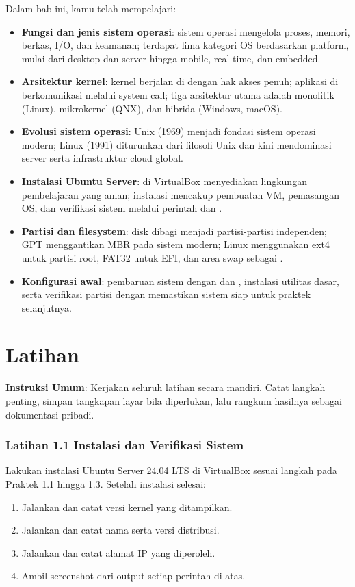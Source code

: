 Dalam bab ini, kamu telah mempelajari:

\begin{itemize}[noitemsep,topsep=2pt]
    \item \textbf{Fungsi dan jenis sistem operasi}: sistem operasi mengelola proses,
    memori, berkas, I/O, dan keamanan; terdapat lima kategori OS berdasarkan platform,
    mulai dari desktop dan server hingga mobile, real-time, dan embedded.
    \item \textbf{Arsitektur kernel}: kernel berjalan di  dengan hak akses
    penuh; aplikasi di  berkomunikasi melalui system call; tiga arsitektur
    utama adalah monolitik (Linux), mikrokernel (QNX), dan hibrida (Windows, macOS).
    \item \textbf{Evolusi sistem operasi}: Unix (1969) menjadi fondasi sistem operasi
    modern; Linux (1991) diturunkan dari filosofi Unix dan kini mendominasi server serta
    infrastruktur cloud global.
    \item \textbf{Instalasi Ubuntu Server}:  di VirtualBox menyediakan
    lingkungan pembelajaran yang aman; instalasi mencakup pembuatan VM, pemasangan OS,
    dan verifikasi sistem melalui perintah  dan .
    \item \textbf{Partisi dan filesystem}: disk dibagi menjadi partisi-partisi
    independen; GPT menggantikan MBR pada sistem modern; Linux menggunakan ext4 untuk
    partisi root, FAT32 untuk EFI, dan area swap sebagai .
    \item \textbf{Konfigurasi awal}: pembaruan sistem dengan  dan
    , instalasi utilitas dasar, serta verifikasi partisi dengan
     memastikan sistem siap untuk praktek selanjutnya.
\end{itemize}

\section{Latihan}
\label{sec:tugas}

\textbf{Instruksi Umum}: Kerjakan seluruh latihan secara mandiri. Catat langkah
penting, simpan tangkapan layar bila diperlukan, lalu rangkum hasilnya sebagai
dokumentasi pribadi.

\subsubsection*{Latihan 1.1 Instalasi dan Verifikasi Sistem}
Lakukan instalasi Ubuntu Server 24.04 LTS di VirtualBox sesuai langkah pada
Praktek 1.1 hingga 1.3. Setelah instalasi selesai:
\begin{enumerate}
    \item Jalankan  dan catat versi kernel yang ditampilkan.
    \item Jalankan  dan catat nama serta versi distribusi.
    \item Jalankan  dan catat alamat IP yang diperoleh.
    \item Ambil screenshot dari output setiap perintah di atas.
\end{enumerate}


